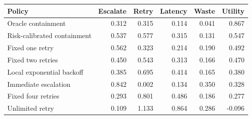 \begin{tabular}{lrrrrr}
\toprule
Policy & Escalate & Retry & Latency & Waste & Utility \\
\midrule
Oracle containment & 0.312 & 0.315 & 0.114 & 0.041 & 0.867 \\
Risk-calibrated containment & 0.537 & 0.577 & 0.315 & 0.131 & 0.547 \\
Fixed one retry & 0.562 & 0.323 & 0.214 & 0.190 & 0.492 \\
Fixed two retries & 0.450 & 0.543 & 0.313 & 0.166 & 0.470 \\
Local exponential backoff & 0.385 & 0.695 & 0.414 & 0.165 & 0.380 \\
Immediate escalation & 0.842 & 0.002 & 0.134 & 0.350 & 0.328 \\
Fixed four retries & 0.293 & 0.801 & 0.486 & 0.186 & 0.277 \\
Unlimited retry & 0.109 & 1.133 & 0.864 & 0.286 & -0.096 \\
\bottomrule
\end{tabular}
